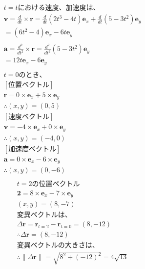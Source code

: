 \documentclass[dvipdfmx,uplatex]{jsarticle}
\begin{document}
  \begin{equation}
    \begin{aligned}
      &t=tにおける速度、加速度は、\\
      &\bm{v} = \frac{d}{dt} \times \bm{r} = \frac{d}{dt}(2t^3 - 4t)\bm{e}_{x} + \frac{d}{dt}(5 - 3t^2)\bm{e}_{y}\nonumber\\
      &=(6t^2 - 4)\bm{e}_{x} -6t\bm{e}_{y}\nonumber\\
      &\\
      &\bm{a} = \frac{d^2}{dt^2} \times \bm{r} = \frac{d^2}{dt^2}(5 - 3t^2)\bm{e}_{y}\nonumber\\
      &=12t\bm{e}_{x} -6\bm{e}_{y}\nonumber\\
      &\\
      &t=0のとき、\\
      &[位置ベクトル]\\
      &\bm{r} = 0 \times \bm{e}_{x} + 5 \times \bm{e}_{y}\nonumber\\
      &\therefore (x, y) = (0, 5)\nonumber\\
      &[速度ベクトル]\\
      &\bm{v} = -4 \times \bm{e}_{x} + 0 \times \bm{e}_{y}\nonumber\\
      &\therefore (x, y) = (-4, 0)\nonumber\\
      &[加速度ベクトル]\\
      &\bm{a} = 0 \times \bm{e}_{x} -6 \times \bm{e}_{y}\nonumber\\
      &\therefore (x, y) = (0, -6)\nonumber\\
    \end{aligned}
  \end{equation}
  \newpage
  \begin{equation}
    \begin{aligned}
      &t=2の位置ベクトル\\
      &\bm{2} = 8 \times \bm{e}_{x} -7 \times \bm{e}_{y}\nonumber\\
      &(x, y) = (8, -7)\nonumber\\
      &変異ベクトルは、\\
      &\Delta \bm{r} = \bm{r}_{t=2} - \bm{r}_{t=0} = (8, -12)\nonumber\\
      &\therefore \Delta \bm{r} = (8, -12)\nonumber\\
      &変異ベクトルの大きさは、\\
      &\therefore \|\Delta \bm{r}\| = \sqrt{8^2 + (-12)^2} = 4\sqrt{13}\nonumber\\
    \end{aligned}
  \end{equation}
\end{document}
